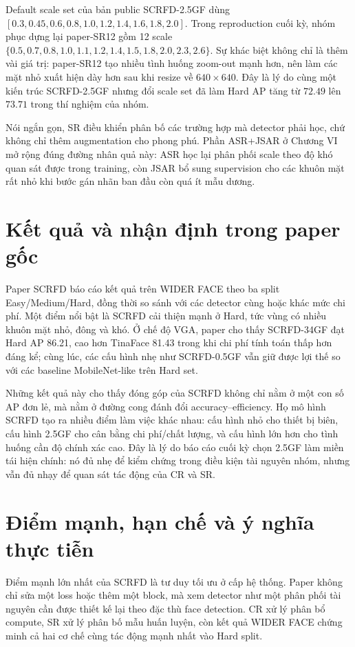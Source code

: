 Default scale set của bản public SCRFD-2.5GF dùng \([0.3,0.45,0.6,0.8,1.0,1.2,1.4,1.6,1.8,2.0]\). Trong reproduction cuối kỳ, nhóm phục dựng lại paper-SR12 gồm 12 scale \(\{0.5, 0.7, 0.8, 1.0, 1.1, 1.2, 1.4, 1.5, 1.8, 2.0, 2.3, 2.6\}\). Sự khác biệt không chỉ là thêm vài giá trị: paper-SR12 tạo nhiều tình huống zoom-out mạnh hơn, nên làm các mặt nhỏ xuất hiện dày hơn sau khi resize về \(640\times640\). Đây là lý do cùng một kiến trúc SCRFD-2.5GF nhưng đổi scale set đã làm Hard AP tăng từ \(72.49\) lên \(73.71\) trong thí nghiệm của nhóm.

Nói ngắn gọn, SR điều khiển phân bố các trường hợp mà detector phải học, chứ không chỉ thêm augmentation cho phong phú. Phần ASR+JSAR ở Chương VI mở rộng đúng đường nhân quả này: ASR học lại phân phối scale theo độ khó quan sát được trong training, còn JSAR bổ sung supervision cho các khuôn mặt rất nhỏ khi bước gán nhãn ban đầu còn quá ít mẫu dương.

\section{Kết quả và nhận định trong paper gốc}

Paper SCRFD báo cáo kết quả trên WIDER FACE theo ba split Easy/Medium/Hard, đồng thời so sánh với các detector cùng hoặc khác mức chi phí. Một điểm nổi bật là SCRFD cải thiện mạnh ở Hard, tức vùng có nhiều khuôn mặt nhỏ, đông và khó. Ở chế độ VGA, paper cho thấy SCRFD-34GF đạt Hard AP 86.21, cao hơn TinaFace 81.43 trong khi chi phí tính toán thấp hơn đáng kể; cùng lúc, các cấu hình nhẹ như SCRFD-0.5GF vẫn giữ được lợi thế so với các baseline MobileNet-like \cite{howard2018mobilenetv2} trên Hard set. \cite{guo2022scrfd}

Những kết quả này cho thấy đóng góp của SCRFD không chỉ nằm ở một con số AP đơn lẻ, mà nằm ở đường cong đánh đổi accuracy--efficiency. Họ mô hình SCRFD tạo ra nhiều điểm làm việc khác nhau: cấu hình nhỏ cho thiết bị biên, cấu hình 2.5GF cho cân bằng chi phí/chất lượng, và cấu hình lớn hơn cho tình huống cần độ chính xác cao. Đây là lý do báo cáo cuối kỳ chọn 2.5GF làm miền tái hiện chính: nó đủ nhẹ để kiểm chứng trong điều kiện tài nguyên nhóm, nhưng vẫn đủ nhạy để quan sát tác động của CR và SR.

\section{Điểm mạnh, hạn chế và ý nghĩa thực tiễn}

Điểm mạnh lớn nhất của SCRFD là tư duy tối ưu ở cấp hệ thống. Paper không chỉ sửa một loss hoặc thêm một block, mà xem detector như một phân phối tài nguyên cần được thiết kế lại theo đặc thù face detection. CR xử lý phân bổ compute, SR xử lý phân bố mẫu huấn luyện, còn kết quả WIDER FACE chứng minh cả hai cơ chế cùng tác động mạnh nhất vào Hard split.

